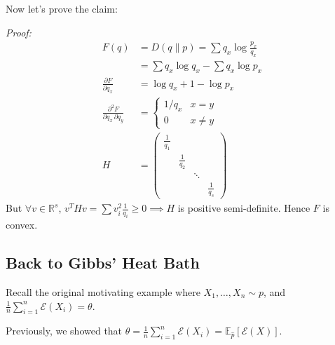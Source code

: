 \documentclass[12pt]{report}
\renewcommand{\hat}[1]{\widehat{#1}}
\newcommand{\R}{\mathbb{R}}
\newcommand{\E}{\mathbb{E}}
\newcommand{\Ec}{\mathcal{E}}
\newenvironment*{proof}[1][blue]{
\begin{tcolorbox}[
    parbox=false,
    colback=#1!5!white,
    colframe=#1!75!black,
    breakable
]}
{\end{tcolorbox}}
\begin{document}
Now let's prove the claim:
\begin{proof}
    \emph{Proof:}
    \begin{align*}
        F(q)                                              & = D(q \parallel p) = \sum q_x \log \frac{p_x}{q_x} \\
                                                          & = \sum q_x \log q_x - \sum q_x \log p_x            \\
        \frac{\partial F}{\partial q_x}                   & = \log q_x + 1 - \log p_x                          \\
        \frac{\partial^2 F}{\partial q_x \, \partial q_y} & = \begin{cases}
                                                                  1/q_x & x = y    \\
                                                                  0     & x \neq y
                                                              \end{cases}                                 \\
        H                                                 & = \begin{pmatrix}
                                                                  \frac{1}{q_1}                             \\
                                                                   & \frac{1}{q_2}                          \\
                                                                   &               & \ddots                 \\
                                                                   &               &        & \frac{1}{q_s}
                                                              \end{pmatrix}
    \end{align*}
    But $\forall v \in \R^s$, $v^T H v = \sum v_i^2 \frac{1}{q_i} \geq 0 \implies H$ is positive semi-definite. Hence $F$ is convex.
\end{proof}

\subsection{Back to Gibbs' Heat Bath}
Recall the original motivating example where $X_1, \dots, X_n \sim p$, and $\frac{1}{n} \sum_{i=1}^{n} \Ec(X_i) = \theta$.

Previously, we showed that $\theta = \frac{1}{n} \sum_{i=1}^{n} \Ec(X_i) = \E_{\hat p} [\Ec(X)]$.
\end{document}
